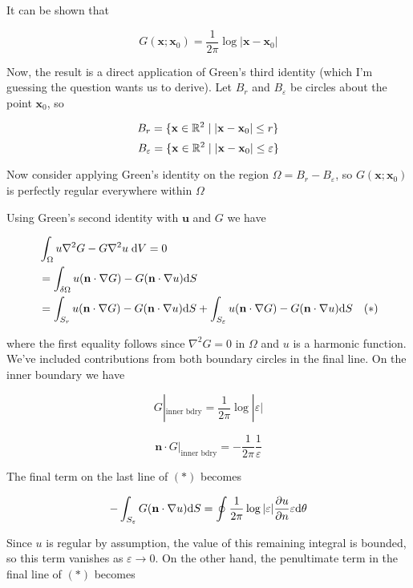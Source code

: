 \documentclass[a4paper]{article}
\begin{document}
It can be shown that

\[ G (\mathbf{x} ; \mathbf{x}_{0} ) = \frac{1}{2\pi} \log | \mathbf{x} - \mathbf{x}_{0} | \]

Now, the result is a direct application of Green's third identity (which I'm guessing the question wants us to derive). Let $ B_{r} $ and $ B_{\varepsilon} $ be circles about the point $ \mathbf{x}_{0} $, so

\[ B_{r} = \{ \mathbf{x} \in \mathbb{R}^{2} \; | \; | \mathbf{x} - \mathbf{x}_{0} | \leq r \} \]
\[ B_{\varepsilon} = \{ \mathbf{x} \in \mathbb{R}^{2} \; | \; | \mathbf{x} - \mathbf{x}_{0} | \leq \varepsilon \} \]

Now consider applying Green's identity on the region $ \Omega = B_{r} - B_{\varepsilon} $, so $ G(\mathbf{x};\mathbf{x}_{0}) $ is perfectly regular everywhere within $ \Omega $


 Using Green's second identity with $ \mathbf{u} $ and $ G $ we have

\begin{align*}
& \int_{\Omega}  u \nabla^{2} G  - G \nabla^{2} u \; \mathrm{d} V = 0 \\
& = \int_{\delta \Omega} u ( \mathbf{n} \cdot \nabla G ) - G ( \mathbf{n} \cdot \nabla u ) \mathrm{d} S  \\
& = \int_{S_{r}} u ( \mathbf{n} \cdot \nabla G ) - G ( \mathbf{n} \cdot \nabla u ) \mathrm{d} S + \int_{S_{\varepsilon}} u ( \mathbf{n} \cdot \nabla G ) - G ( \mathbf{n} \cdot \nabla u ) \mathrm{d} S \quad(*)
\end{align*}

where the first equality follows since $ \nabla^{2} G = 0 $ in $ \Omega $ and $ u $ is a harmonic function. We've included contributions from both boundary circles in the final line. On the inner boundary we have

\[ G|_{\text{inner bdry}} = \frac{1}{2\pi} \log | \varepsilon | \]

\[ \mathbf{n} \cdot G|_{\text{inner bdry}} = - \frac{1}{2\pi} \frac{1}{\varepsilon}  \]


The final term on the last line of $ (*) $ becomes

\[ - \int_{S_{\varepsilon}} G ( \mathbf{n} \cdot \nabla u ) \mathrm{d} S =  \oint \frac{1}{2\pi} \log | \varepsilon | \frac{\partial u }{\partial n} \varepsilon \mathrm{d} \theta  \]

Since $ u $ is regular by assumption, the value of this remaining integral is bounded, so this term vanishes as $ \varepsilon \to 0 $. On the other hand, the penultimate term in the final line of $ (*) $ becomes
\end{document}
